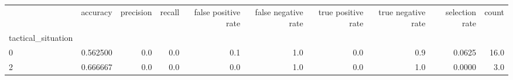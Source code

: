 \begin{tabular}{lrrrrrrrrr}
\toprule
{} &  accuracy &  precision &  recall &  false positive rate &  false negative rate &  true positive rate &  true negative rate &  selection rate &  count \\
tactical\_situation &           &            &         &                      &                      &                     &                     &                 &        \\
\midrule
0                  &  0.562500 &        0.0 &     0.0 &                  0.1 &                  1.0 &                 0.0 &                 0.9 &          0.0625 &   16.0 \\
2                  &  0.666667 &        0.0 &     0.0 &                  0.0 &                  1.0 &                 0.0 &                 1.0 &          0.0000 &    3.0 \\
\bottomrule
\end{tabular}
